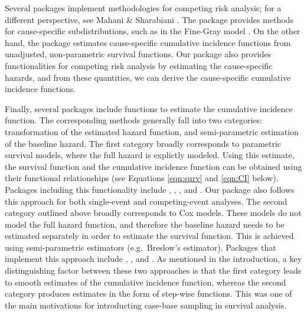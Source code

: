 \documentclass[
]{jss}
\begin{document}
Several  packages implement methodologies for competing risk
analysis; for a different perspective, see Mahani \& Sharabiani
\citeyearpar{mahani2015bayesian}. The package  provides
methods for cause-specific subdistributions, such as in the Fine-Gray
model \citeyearpar{fine1999proportional}. On the other hand, the package
 estimates cause-specific cumulative incidence functions from
unadjusted, non-parametric survival functions. Our package
 also provides functionalities for competing risk analysis
by estimating the cause-specific hazards, and from these quantities, we
can derive the cause-specific cumulative incidence functions.

Finally, several packages include functions to estimate the cumulative
incidence function. The corresponding methods generally fall into two
categories: transformation of the estimated hazard function, and
semi-parametric estimation of the baseline hazard. The first category
broadly corresponds to parametric survival models, where the full hazard
is explictly modeled. Using this estimate, the survival function and the
cumulative incidence function can be obtained using their functional
relationships (see Equations \ref{eqn:surv} and \ref{eqn:CI} below).
Packages including this functionality include , ,
, and . Our package  also follows
this approach for both single-event and competing-event analyses. The
second category outlined above broadly corresponds to Cox models. These
models do not model the full hazard function, and therefore the baseline
hazard needs to be estimated separately in order to estimate the
survival function. This is achieved using semi-parametric estimators
(e.g.~Breslow's estimator). Packages that implement this approach
include , , and . As
mentioned in the introduction, a key distinguishing factor between these
two approaches is that the first category leads to smooth estimates of
the cumulative incidence function, whereas the second category produces
estimates in the form of step-wise functions. This was one of the main
motivations for introducting case-base sampling in survival analysis.
\end{document}
